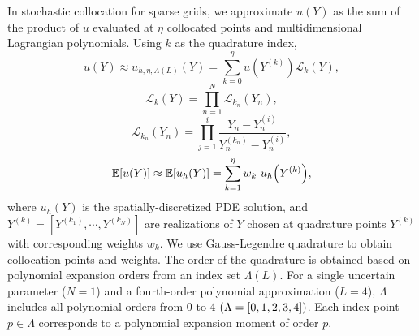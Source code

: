 \documentclass{anstrans}
\newcommand{\expv}[1]{\ensuremath{\mathbb{E}[ #1]}}
\begin{document}
In stochastic collocation for sparse grids, we approximate $u(Y)$ as the sum of the product of $u$ evaluated at $\eta$ collocated points and multidimensional Lagrangian polynomials.  Using $k$ as the quadrature index,
\begin{equation}\label{approx}
u(Y)\approx u_{h,\eta,\Lambda(L)}(Y)=\sum_{k=0}^\eta u(Y^{(k)})\mathcal{L}_k(Y),
\end{equation}
\begin{equation}
\mathcal{L}_k(Y)=\prod_{n=1}^N \mathcal{L}_{k_n}(Y_n),
\end{equation}
\begin{equation}
\mathcal{L}_{k_n}(Y_n)=\prod_{j=1}^i \frac{Y_n-Y_n^{(i)}}{Y_n^{(k_n)}-Y_n^{(i)}},
\end{equation}
\begin{equation}
\expv{u(Y)}\approx\expv{u_h(Y)}=\sum_{k=1}^\eta w_k ~u_h\qty(Y^{(k)}),
\end{equation}
where $u_h(Y)$ is the spatially-discretized PDE solution, and $Y^{(k)}=[Y^{(k_1)},\cdots,Y^{(k_N)}]$ are realizations of $Y$ chosen at quadrature points $Y^{(k)}$ with corresponding weights $w_k$.  We use Gauss-Legendre quadrature to obtain collocation points and weights.  The order of the quadrature is obtained based on polynomial expansion orders from an index set $\Lambda(L)$.  For a single uncertain parameter ($N=1$) and a fourth-order polynomial approximation ($L=4$), $\Lambda$ includes all polynomial orders from 0 to 4 $\qty(\Lambda=[0,1,2,3,4])$.  Each index point $p\in\Lambda$ corresponds to a polynomial expansion moment of order $p$.
\end{document}
